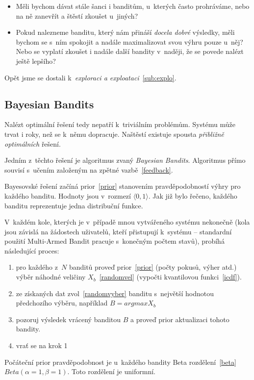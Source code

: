 \documentclass[thesis=M,czech]{FITthesis}[2014/05/07]
\begin{document}
\begin{itemize}
	\item Měli bychom dávat stále šanci i banditům, u~kterých často prohráváme, nebo na ně zanevřít a štěstí zkoušet u~jiných?
	\item Pokud nalezneme banditu, který nám přináší \emph{docela dobré} výsledky, měli bychom se s~ním spokojit a nadále maximalizovat svou výhru pouze u~něj? Nebo se vyplatí zkoušet i nadále další bandity v~naději, že se povede nalézt ještě lepšího?
\end{itemize}

Opět jsme se dostali k~\emph{exploraci a exploataci}~\ref{sub:explo}.	

\subsection{Bayesian Bandits}
\label{bayes}
Nalézt optimální řešení tedy nepatří k~triviálním problémům. Systému může trvat i roky, než se k~němu dopracuje. Naštěstí existuje spousta \emph{přibližně optimálních} řešení.

Jedním z~těchto řešení je algoritmus zvaný \emph{Bayesian Bandits}. Algoritmus přímo souvisí s~učením založeným na zpětné vazbě~\ref{feedback}.

Bayesovské řešení začíná prior~\ref{prior} stanovením pravděpodobností výhry pro každého banditu. Hodnoty jsou v~rozmezí $\langle0,1\rangle$. Jak již bylo řečeno, každého banditu reprezentuje jedna distribuční funkce.

V~každém kole, kterých je v~případě mnou vytvářeného systému nekonečně (kola jsou závislá na žádostech uživatelů, kteří přistupují k~systému – standardní použití Multi-Armed Bandit pracuje s~konečným počtem stavů), probíhá následující proces:

\begin{enumerate}
	\item pro každého z~$N$ banditů proveď prior~\ref{prior} (počty pokusů, výher atd.) výběr náhodné veličiny $X_b$~\ref{randomvel} (vypočti kvantilovou funkci~\ref{icdf}). 
	\item ze získaných dat zvol~\ref{randomvyber} banditu s~největší hodnotou předchozího výběru, například $B = argmax X_b$	
	\item pozoruj výsledek vrácený banditou $B$ a proveď prior aktualizaci tohoto bandity.
	\item vrať se na krok 1
\end{enumerate}

Počáteční prior pravděpodobnost je u~každého bandity Beta rozdělení~\ref{beta} ${Beta}(\alpha = 1, \beta = 1)$. Toto rozdělení je uniformní.
\end{document}
